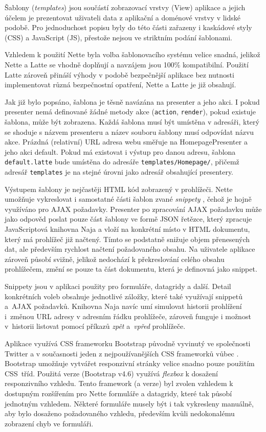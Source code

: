 Šablony (\textit{templates}) jsou součástí zobrazovací vrstvy (View) aplikace a jejich účelem je prezentovat uživateli data z aplikační a doménové vrstvy v lidské podobě. Pro jednoduchost popisu byly do této části zařazeny i kaskádové styly (CSS) a JavaScript (JS), přestože nejsou ve striktním podání šablonami.

Vzhledem k použití Nette byla volba šablonovacího systému velice snadná, jelikož Nette a Latte se vhodně doplňují a navzájem jsou 100\% kompatibilní. Použití Latte zároveň přináší výhody v podobě bezpečnější aplikace bez nutnosti implementovat různá bezpečnostní opatření, Nette a Latte je již obsahují.

Jak již bylo popsáno, šablona je těsně navázána na presenter a jeho akci. I pokud presenter nemá definované žádné metody akce (\texttt{action}, \texttt{render}), pokud existuje šablona, může být zobrazena. Každá šablona musí být umístěna v adresáři, který se shoduje s názvem presenteru a název souboru šablony musí odpovídat názvu akce. Prázdná (relativní) URL adresa webu směřuje na HomepagePresenter a jeho akci default. Pokud má existovat i výstup pro danou adresu, šablona \texttt{default.latte} bude umístěna do adresáře \texttt{templates/Homepage/}, přičemž adresář \texttt{templates} je na stejné úrovni jako adresář obsahující presentery.

Výstupem šablony je nejčastěji HTML kód zobrazený v prohlížeči. Nette umožňuje vykreslovat i samostatné části šablon zvané \textit{snippety} \cite{NetteDocs}, čehož je hojně využíváno pro AJAX požadavky. Presenter po zpracování AJAX požadavku může jako odpověd poslat pouze část šablony ve formě JSON řetězce, který zpracuje JavaScriptová knihovna Naja a vloží na konkrétní místo v HTML dokumentu, který má prohlížeč již načtený. Tímto se podstatně snižuje objem přenesených dat, ale především rychlost načtení požadovaného obsahu. Na uživatele aplikace zároveň působí svižně, jelikož nedochází k překreslování celého obsahu prohlížečem, změní se pouze ta část dokumentu, která je definovná jako snippet.

Snippety jsou v aplikaci použity pro formuláře, datagridy a další. Detail konkrétních voleb obsahuje jednotlivé záložky, které také využívají snippetů a~AJAX požadavků. Knihovna Naja navíc umí simulovat historii prohlížení i~změnou URL adresy v adresním řádku prohlížeče, zároveň funguje i možnost v~historii listovat pomocí příkazů \textit{zpět} a~\textit{vpřed} prohlížeče.

Aplikace využívá CSS frameworku Bootstrap původně vyvinutý ve společnosti Twitter a v současnosti jeden z nejpoužívanějších CSS frameworků vůbec \cite{Bootstrap}. Bootstrap umožňuje vytvářet responzivní stránky velice snadno pouze použitím CSS~tříd. Použitá verze (Bootstrap v4.6) využívá \textit{flexbox} k dosažení responzivního vzhledu. Tento framework (a verze) byl zvolen vzhledem k dostupným rozšířením pro Nette formuláře a datagridy, které tak působí jednotným vzhledem. Některé formuláře musely být i tak vykresleny manuálně, aby bylo dosaženo požadovaného vzhledu, především kvůli nedokonalému zobrazení chyb ve formuláři.

